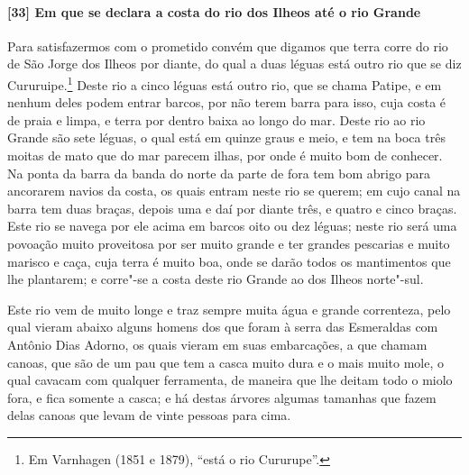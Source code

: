 \paragraph{[33] Em que se declara a costa do rio dos Ilheos até o rio Grande} \quad
Para satisfazermos com o prometido convém que digamos que terra corre do rio de São Jorge
dos Ilheos por diante, do qual a duas léguas está outro rio que se diz
Cururuipe.\footnote{ Em Varnhagen (1851 e 1879), ``está o rio Cururupe''.} Deste rio a
cinco léguas está outro rio, que se chama Patipe, e em nenhum deles podem entrar barcos,
por não terem barra para isso, cuja costa é de praia e limpa, e terra por dentro baixa ao
longo do mar. Deste rio ao rio Grande são sete léguas, o qual está em quinze graus e meio,
e tem na boca três moitas de mato que do mar parecem ilhas, por onde é muito bom de
conhecer. Na ponta da barra da banda do norte da parte de fora tem bom abrigo para
ancorarem navios da costa, os quais entram neste rio se querem; em cujo canal na barra tem
duas braças, depois uma e daí por diante três, e quatro e cinco braças. Este rio se navega
por ele acima em barcos oito ou dez léguas; neste rio será uma povoação muito proveitosa
por ser muito grande e ter grandes pescarias e muito marisco e caça, cuja terra é muito
boa, onde se darão todos os mantimentos que lhe plantarem; e corre"-se a costa deste rio
Grande ao dos Ilheos norte"-sul.

Este rio vem de muito longe e traz sempre muita água e grande correnteza, pelo qual vieram
abaixo alguns homens dos que foram à serra das Esmeraldas com Antônio Dias Adorno, os
quais vieram em suas embarcações, a que chamam canoas, que são de um pau que tem a casca
muito dura e o mais muito mole, o qual cavacam com qualquer ferramenta, de maneira que lhe
deitam todo o miolo fora, e fica somente a casca; e há destas árvores algumas tamanhas que
fazem delas canoas que levam de vinte pessoas para cima.

